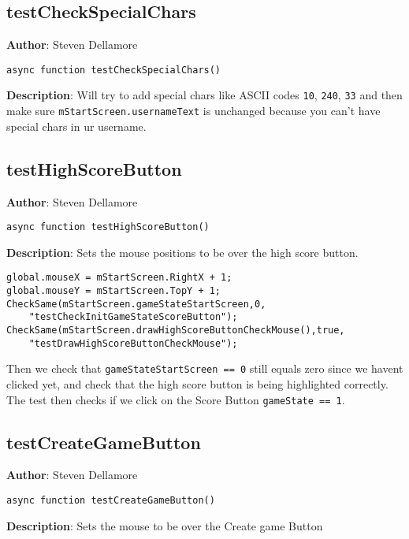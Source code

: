 \documentclass[12pt]{article}
\begin{document}
\subsection{testCheckSpecialChars}
\textbf{Author}: Steven Dellamore 
\vspace*{1\baselineskip}
\begin{lstlisting}
async function testCheckSpecialChars()
\end{lstlisting} 
\vspace*{1\baselineskip}
\textbf{Description}: Will try to add special chars like ASCII codes \texttt{10}, \texttt{240}, \texttt{33} and then make sure \texttt{mStartScreen.usernameText} is unchanged because you can't have special chars in ur username. 



\subsection{testHighScoreButton}
\textbf{Author}: Steven Dellamore 
\vspace*{1\baselineskip}
\begin{lstlisting}
async function testHighScoreButton()
\end{lstlisting} 
\vspace*{1\baselineskip}
\textbf{Description}: Sets the mouse positions to be over the high score button. 
\begin{verbatim}
global.mouseX = mStartScreen.RightX + 1;
global.mouseY = mStartScreen.TopY + 1;
CheckSame(mStartScreen.gameStateStartScreen,0,
    "testCheckInitGameStateScoreButton");
CheckSame(mStartScreen.drawHighScoreButtonCheckMouse(),true,
    "testDrawHighScoreButtonCheckMouse");
\end{verbatim}
 Then we check that \texttt{gameStateStartScreen == 0} still equals zero since we havent clicked yet, and check that the high score button is being highlighted correctly. The test then checks if we click on the Score Button \texttt{gameState == 1}. 



\subsection{testCreateGameButton}
\textbf{Author}: Steven Dellamore 
\vspace*{1\baselineskip}
\begin{lstlisting}
async function testCreateGameButton()
\end{lstlisting} 
\vspace*{1\baselineskip}
\textbf{Description}: Sets the mouse to be over the Create game Button 
\end{document}
